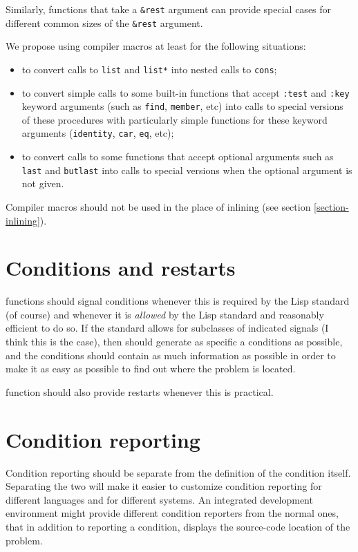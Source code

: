 Similarly, functions that take a \texttt{\&rest} argument can provide
special cases for different common sizes of the \texttt{\&rest}
argument.

We propose using compiler macros at least for the following
situations: 

\begin{itemize}
\item to convert calls to \texttt{list} and \texttt{list*} into nested
  calls to \texttt{cons};
\item to convert simple calls to some built-in functions that accept
  \texttt{:test} and \texttt{:key} keyword arguments (such as
  \texttt{find}, \texttt{member}, etc) into calls to
  special versions of these procedures with particularly simple
  functions for these keyword arguments (\texttt{identity},
  \texttt{car}, \texttt{eq}, etc);
\item to convert calls to some functions that accept optional
  arguments such as \texttt{last} and \texttt{butlast} into calls to
  special versions when the optional argument is not given.
\end{itemize}

Compiler macros should not be used in the place of inlining (see
section \ref{section-inlining}).

\section{Conditions and restarts}

\sysname{} functions should signal conditions whenever this is
required by the Lisp standard (of course) and whenever it is
\emph{allowed} by the Lisp standard and reasonably efficient to do so.
If the standard allows for subclasses of indicated signals (I think
this is the case), then \sysname{} should generate as specific a
conditions as possible, and the conditions should contain as much
information as possible in order to make it as easy as possible to
find out where the problem is located.

\sysname{} function should also provide restarts whenever this is
practical. 

\section{Condition reporting}

Condition reporting should be separate from the definition of the
condition itself.  Separating the two will make it easier to customize
condition reporting for different languages and for different
systems.  An integrated development environment might provide
different condition reporters from the normal ones, that in addition
to reporting a condition, displays the source-code location of the
problem. 

